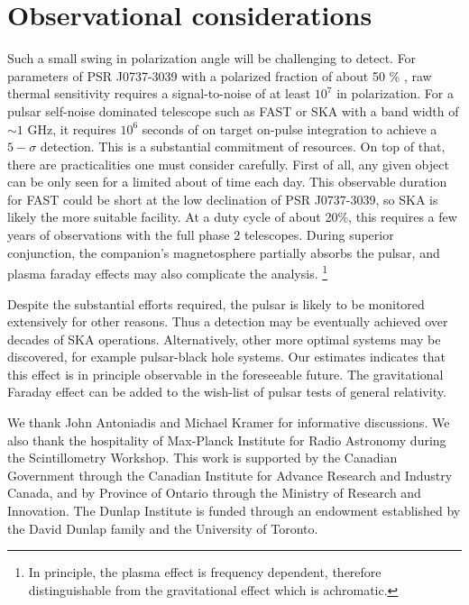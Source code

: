 \documentclass[aps,showpacs,twocolumn,floats,prd,superscriptaddress,nofootinbib]{revtex4-1}
\begin{document}
\section{Observational considerations}
\label{sec-obs}

Such a small swing in polarization angle will be challenging to detect.
For parameters of PSR J0737-3039 with a polarized fraction of about 50
\% \cite{2004ApJ...615L.137D}, raw thermal sensitivity requires a
signal-to-noise of at least $10^7$ in polarization.  
For a pulsar self-noise dominated telescope such as FAST \cite{FAST} or SKA \cite{SKA} with a band width of $\sim 1$ GHz, it requires $10^6$ seconds of on target on-pulse integration to achieve a $5-\sigma$ detection.
This is a substantial commitment of resources.  
On top of that, there are practicalities one must consider carefully.
First of all, any given object can be only seen for a limited about of time each day.
This observable duration for FAST could be short at the low declination of PSR J0737-3039, so SKA is likely the more suitable facility. 
At a duty cycle of about 20\%, this requires a few years of observations with the full phase 2 telescopes.  
During superior conjunction, the companion's magnetosphere partially absorbs the pulsar, and plasma faraday effects may also complicate the analysis.
\footnote{In principle, the plasma effect is frequency dependent, therefore distinguishable from the gravitational effect which is achromatic.} 

Despite the substantial efforts required, the pulsar is likely to be monitored extensively for other reasons.
Thus a detection may be eventually achieved over decades of SKA operations.  
Alternatively, other more optimal systems may be discovered, for example pulsar-black hole systems.  
Our estimates indicates that this effect is in principle observable in the foreseeable future.  
The gravitational Faraday effect can be added to the wish-list of pulsar tests of general relativity.

\newcommand{\apjl}{ApJ}      %

\acknowledgments

We thank John Antoniadis and Michael Kramer for informative discussions.
We also thank the hospitality of Max-Planck Institute for Radio Astronomy during the Scintillometry Workshop.
This work is supported by the Canadian Government through the Canadian Institute for Advance Research and Industry Canada, and by Province of Ontario through the Ministry of Research and Innovation. 
The Dunlap Institute is funded through an endowment established by the David Dunlap family and the University of Toronto.

\end{document}
